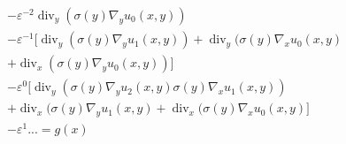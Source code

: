 \documentclass[10pt]{beamer}	%
\begin{document}
\begin{frame}
\begin{align*}
&-\varepsilon^{-2}\operatorname{div}_y(\sigma(y)\nabla_y u_0(x,y))\\
&-\varepsilon^{-1}[\operatorname{div}_y(\sigma(y)\nabla_y u_1(x,y)) + \operatorname{div}_y(\sigma(y)\nabla_x u_0(x,y)\\ &+ \operatorname{div}_x(\sigma(y)\nabla_y u_0(x,y))]\\
&-\varepsilon^0 [\operatorname{div}_y(\sigma(y)\nabla_y u_2(x,y)\sigma(y)\nabla_x u_1(x,y)) \\&+ \operatorname{div}_x(\sigma(y)\nabla_y u_1(x,y) +  \operatorname{div}_x(\sigma(y)\nabla_x u_0(x,y)]\\
&-\varepsilon^1 ... =g(x)
\end{align*}
\end{frame}
\end{document}
